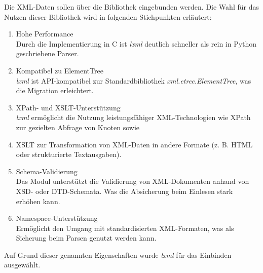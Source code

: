 Die XML-Daten sollen über die Bibliothek  eingebunden werden.
Die Wahl für das Nutzen dieser Bibliothek wird in folgenden Stichpunkten erläutert: \cite{lxml}

\begin{enumerate}

\item Hohe Performance \\
Durch die Implementierung in C ist \textit{lxml} deutlich schneller als rein in Python geschriebene Parser.

\item Kompatibel zu ElementTree \\
\textit{lxml} ist API-kompatibel zur Standardbibliothek \textit{xml.etree.ElementTree}, was die Migration erleichtert.

\item XPath- und XSLT-Unterstützung \\
\textit{lxml} ermöglicht die Nutzung leistungsfähiger XML-Technologien wie XPath zur gezielten Abfrage von Knoten sowie
\item XSLT zur Transformation von XML-Daten in andere Formate (z. B. HTML oder strukturierte Textausgaben).

\item Schema-Validierung \\
Das Modul unterstützt die Validierung von XML-Dokumenten anhand von XSD- oder DTD-Schemata.
Was die Absicherung beim Einlesen stark erhöhen kann.

\item Namespace-Unterstützung \\
Ermöglicht den Umgang mit standardisierten XML-Formaten, was als Sicherung beim Parsen genutzt werden kann.

\end{enumerate}

Auf Grund dieser genannten Eigenschaften wurde \textit{lxml} für das Einbinden ausgewählt.



